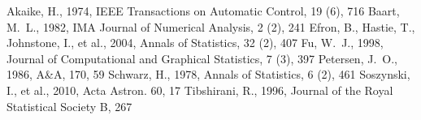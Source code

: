 \documentclass[11pt,twoside]{book}
\begin{document}


\begin{thebibliography}{}      
Akaike, H., 1974, IEEE Transactions on Automatic Control, 19 (6), 716
Baart, M.~L., 1982, IMA Journal of Numerical Analysis, 2 (2), 241
Efron, B., Hastie, T., Johnstone, I., et al., 2004, Annals of Statistics, 32 (2), 407
Fu, W.~J., 1998, Journal of Computational and Graphical Statistics, 7 (3), 397
Petersen, J.~O., 1986, A\&A, 170, 59
Schwarz, H., 1978, Annals of Statistics, 6 (2), 461
Soszynski, I., et al., 2010, Acta Astron. 60, 17
Tibshirani, R., 1996, Journal of the Royal Statistical Society B, 267
\end{thebibliography}
\end{document}
